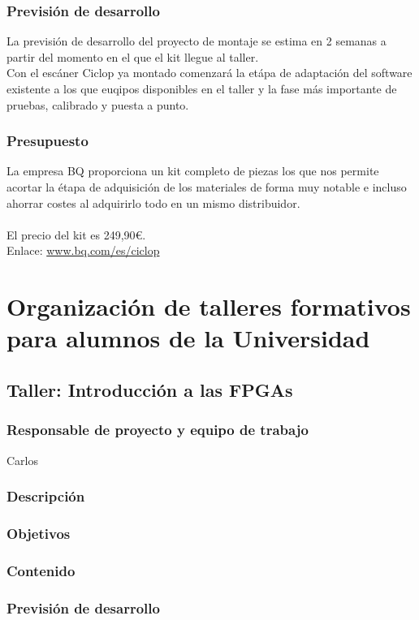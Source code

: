\documentclass[12pt,twoside]{report}
\begin{document}
\subsubsection{Previsión de desarrollo}
La previsión de desarrollo del proyecto de montaje se estima en 2 semanas a partir del momento en el que el kit llegue al taller.\\
Con el escáner Ciclop ya montado comenzará la etápa de adaptación del software existente a los que euqipos disponibles en el taller y la fase más importante de pruebas, calibrado y puesta a punto.
\subsubsection{Presupuesto}
La empresa BQ proporciona un kit completo de piezas los que nos permite acortar la étapa de adquisición de los materiales de forma muy notable e incluso ahorrar costes al adquirirlo todo en un mismo distribuidor. \\
\\
El precio del kit es 249,90\euro{}.\\
Enlace: \url{www.bq.com/es/ciclop}

\section{Organización de talleres formativos para alumnos de la Universidad}

\subsection{Taller: Introducción a las FPGAs}
\subsubsection{Responsable de proyecto y equipo de trabajo}
Carlos
\subsubsection{Descripción}
\subsubsection{Objetivos}
\subsubsection{Contenido}
\subsubsection{Previsión de desarrollo}
\end{document}
